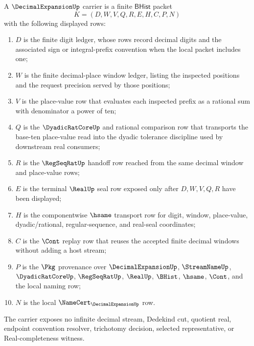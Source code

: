 \begin{definition}\label{def:decimal-expansion-carrier}
A $\DecimalExpansionUp$ carrier is a finite $\mathsf{BHist}$ packet
$$
K=(D,W,V,Q,R,E,H,C,P,N)
$$
with the following displayed rows:
\begin{enumerate}
\item $D$ is the finite digit ledger, whose rows record decimal digits and the
associated sign or integral-prefix convention when the local packet includes
one;
\item $W$ is the finite decimal-place window ledger, listing the inspected
positions and the request precision served by those positions;
\item $V$ is the place-value row that evaluates each inspected prefix as a
rational sum with denominator a power of ten;
\item $Q$ is the $\DyadicRatCoreUp$ and rational comparison row that transports
the base-ten place-value read into the dyadic tolerance discipline used by
downstream real consumers;
\item $R$ is the $\RegSeqRatUp$ handoff row reached from the same decimal
window and place-value rows;
\item $E$ is the terminal $\RealUp$ seal row exposed only after $D,W,V,Q,R$
have been displayed;
\item $H$ is the componentwise $\hsame$ transport row for digit, window,
place-value, dyadic/rational, regular-sequence, and real-seal coordinates;
\item $C$ is the $\Cont$ replay row that reuses the accepted finite decimal
windows without adding a host stream;
\item $P$ is the $\Pkg$ provenance over $\DecimalExpansionUp$,
$\StreamNameUp$, $\DyadicRatCoreUp$, $\RegSeqRatUp$, $\RealUp$, $\BHist$,
$\hsame$, $\Cont$, and the local naming row;
\item $N$ is the local $\NameCert_{\DecimalExpansionUp}$ row.
\end{enumerate}
The carrier exposes no infinite decimal stream, Dedekind cut, quotient real,
endpoint convention resolver, trichotomy decision, selected representative, or
Real-completeness witness.
\end{definition}

